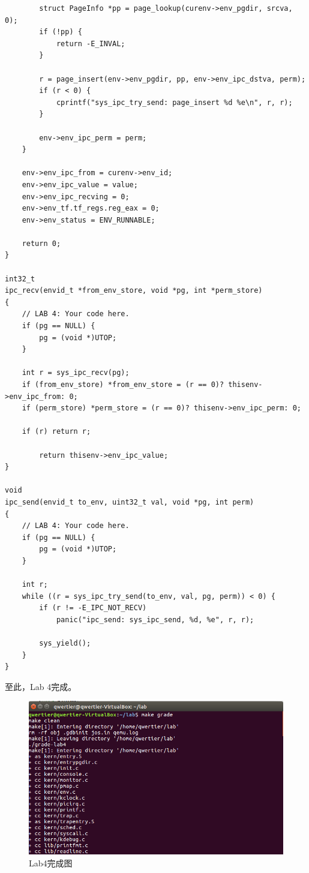 \begin{ExerciseList}
\begin{verbatim}
        struct PageInfo *pp = page_lookup(curenv->env_pgdir, srcva, 0);
        if (!pp) {
            return -E_INVAL;
        }

        r = page_insert(env->env_pgdir, pp, env->env_ipc_dstva, perm);
        if (r < 0) {
            cprintf("sys_ipc_try_send: page_insert %d %e\n", r, r);
        }

        env->env_ipc_perm = perm;
    }

    env->env_ipc_from = curenv->env_id;
    env->env_ipc_value = value;
    env->env_ipc_recving = 0;
    env->env_tf.tf_regs.reg_eax = 0;
    env->env_status = ENV_RUNNABLE;

    return 0;
}

int32_t
ipc_recv(envid_t *from_env_store, void *pg, int *perm_store)
{
    // LAB 4: Your code here.
    if (pg == NULL) {
        pg = (void *)UTOP;
    }

    int r = sys_ipc_recv(pg);
    if (from_env_store) *from_env_store = (r == 0)? thisenv->env_ipc_from: 0;
    if (perm_store) *perm_store = (r == 0)? thisenv->env_ipc_perm: 0;

    if (r) return r;

        return thisenv->env_ipc_value;
}

void
ipc_send(envid_t to_env, uint32_t val, void *pg, int perm)
{
    // LAB 4: Your code here.
    if (pg == NULL) {
        pg = (void *)UTOP;
    }

    int r;
    while ((r = sys_ipc_try_send(to_env, val, pg, perm)) < 0) {
        if (r != -E_IPC_NOT_RECV)
            panic("ipc_send: sys_ipc_send, %d, %e", r, r);

        sys_yield();
    }
}

\end{verbatim}

至此，Lab 4完成。

\begin{figure}[H]
  \centering
  \includegraphics[width=6in]{figures/lab4/finish1.png}
  \caption{Lab4完成图}\label{fig:lab4:finish1}
\end{figure}


\end{ExerciseList}

